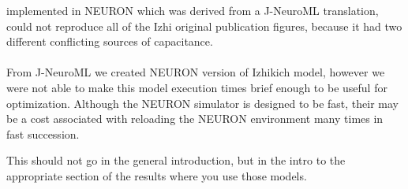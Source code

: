 implemented in NEURON which was derived from a J-NeuroML translation, could not reproduce all of the Izhi original publication figures, because it had two different conflicting sources of capacitance.\\
\\
From J-NeuroML we created NEURON version of Izhikich model, however we were not able to make this model execution times brief enough to be useful for optimization. Although the NEURON simulator is designed to be fast, their may be a cost associated with reloading the NEURON environment many times in fast succession.

This should not go in the general introduction, but in the intro to the appropriate section of the results where you use those models.